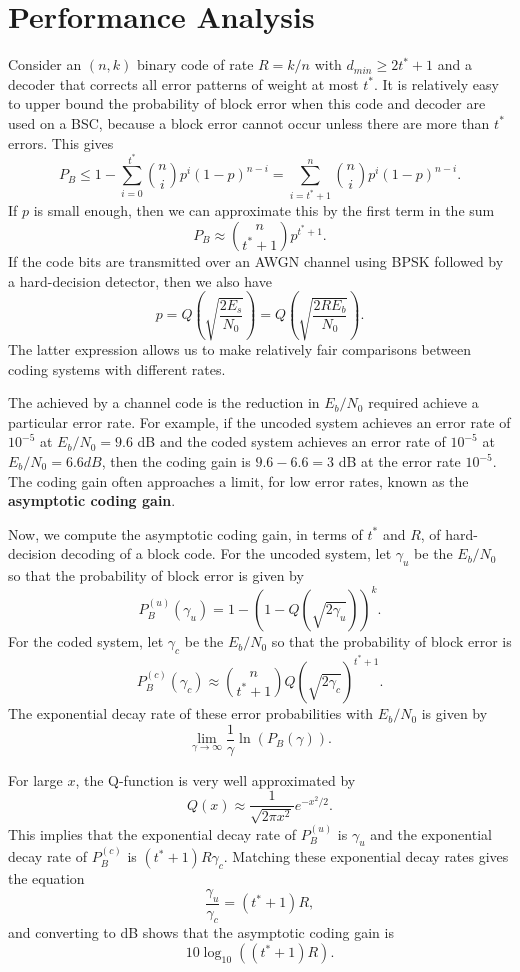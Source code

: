 \section{Performance Analysis}

Consider an $(n,k)$ binary code of rate $R=k/n$ with $d_{min} \geq 2t^* + 1$ and a decoder that corrects all error patterns of weight at most $t^*$.
It is relatively easy to upper bound the probability of block error when this code and decoder are used on a BSC, because a block error cannot occur unless there are more than $t^*$ errors.
This gives
\[ P_{B}\leq1-\sum_{i=0}^{t^*}{n \choose i}p^{i}(1-p)^{n-i}=\sum_{i=t^*+1}^{n}{n \choose i}p^{i}(1-p)^{n-i}. \]
If $p$ is small enough, then we can approximate this by the first term in the sum
\[ P_{B} \approx {n \choose t^* + 1}p^{t^* + 1}.\]
If the code bits are transmitted over an AWGN channel using BPSK followed by a hard-decision detector, then we also have
\[ p= Q\left( \sqrt{\frac{2 E_s}{N_0}} \right) = Q\left( \sqrt{\frac{2 R  E_b}{N_0}} \right). \]
The latter expression allows us to make relatively fair comparisons between coding systems with different rates.
 
\begin{definition}
The  achieved by a channel code is the reduction in $E_b / N_0$ required achieve a particular error rate.
For example, if the uncoded system achieves an error rate of $10^{-5}$ at $E_b / N_0 = 9.6$ dB and the coded system achieves an error rate of $10^{-5}$ at $E_b / N_0 = 6.6 dB$, then the coding gain is $9.6 - 6.6 = 3$ dB at the error rate $10^{-5}$.
The coding gain often approaches a limit, for low error rates, known as the \textbf{asymptotic coding gain}.
\end{definition}

Now, we compute the asymptotic coding gain, in terms of $t^*$ and $R$, of hard-decision decoding of a block code.
For the uncoded system, let $\gamma_u$ be the $E_b / N_0$ so that the probability of block error is given by
\[ P_{B}^{(u)}(\gamma_u) = 1- \left(1 - Q\left( \sqrt{2 \gamma_u} \right) \right)^k. \]
For the coded system, let $\gamma_c$ be the $E_b / N_0$ so that the probability of block error is
\[ P_{B}^{(c)}(\gamma_c) \approx {n \choose t^* + 1} Q\left( \sqrt{2 \gamma_c} \right)^{t^* + 1}. \]
The exponential decay rate of these error probabilities with $E_b/N_0$ is given by
\[ \lim_{\gamma \rightarrow \infty} \frac{1}{\gamma} \ln \left( P_{B} (\gamma) \right). \]

For large $x$, the Q-function is very well approximated by
\[ Q(x) \approx \frac{1}{\sqrt{2 \pi x^2}} e^{-x^2 / 2}. \]
This implies that the exponential decay rate of $P_{B}^{(u)}$ is $\gamma_u$ and the exponential decay rate of  $P_{B}^{(c)}$ is $(t^* + 1)R\gamma_c$.
Matching these exponential decay rates gives the equation
\[ \frac{\gamma_u}{\gamma_c} = (t^* + 1) R, \]
and converting to dB shows that the asymptotic coding gain is
\[ 10 \log_{10} \left( (t^* + 1) R \right). \]

